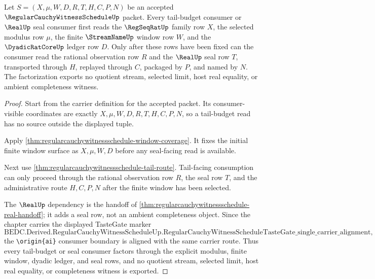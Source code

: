 \begin{theorem}
\label{thm:regular-cauchy-witness-schedule-tail-budget-factorization}
Let $S=(X,\mu,W,D,R,T,H,C,P,N)$ be an accepted $\RegularCauchyWitnessScheduleUp$ packet. Every tail-budget consumer or $\RealUp$ seal consumer first reads the $\RegSeqRatUp$ family row $X$, the selected modulus row $\mu$, the finite $\StreamNameUp$ window row $W$, and the $\DyadicRatCoreUp$ ledger row $D$. Only after these rows have been fixed can the consumer read the rational observation row $R$ and the $\RealUp$ seal row $T$, transported through $H$, replayed through $C$, packaged by $P$, and named by $N$. The factorization exports no quotient stream, selected limit, host real equality, or ambient completeness witness.
\end{theorem}
\begin{proof}
Start from the carrier definition for the accepted packet. Its consumer-visible coordinates are exactly $X,\mu,W,D,R,T,H,C,P,N$, so a tail-budget read has no source outside the displayed tuple.

Apply \autoref{thm:regularcauchywitnessschedule-window-coverage}. It fixes the initial finite window surface as $X,\mu,W,D$ before any seal-facing read is available.

Next use \autoref{thm:regularcauchywitnessschedule-tail-route}. Tail-facing consumption can only proceed through the rational observation row $R$, the seal row $T$, and the administrative route $H,C,P,N$ after the finite window has been selected.

The $\RealUp$ dependency is the handoff of \autoref{thm:regularcauchywitnessschedule-real-handoff}; it adds a seal row, not an ambient completeness object. Since the chapter carries the displayed TasteGate marker
$$
\text{BEDC.Derived.RegularCauchyWitnessScheduleUp.RegularCauchyWitnessScheduleTasteGate\_single\_carrier\_alignment},
$$
the \texttt{\textbackslash origin\{ai\}} consumer boundary is aligned with the same carrier route. Thus every tail-budget or seal consumer factors through the explicit modulus, finite window, dyadic ledger, and seal rows, and no quotient stream, selected limit, host real equality, or completeness witness is exported.
\end{proof}

